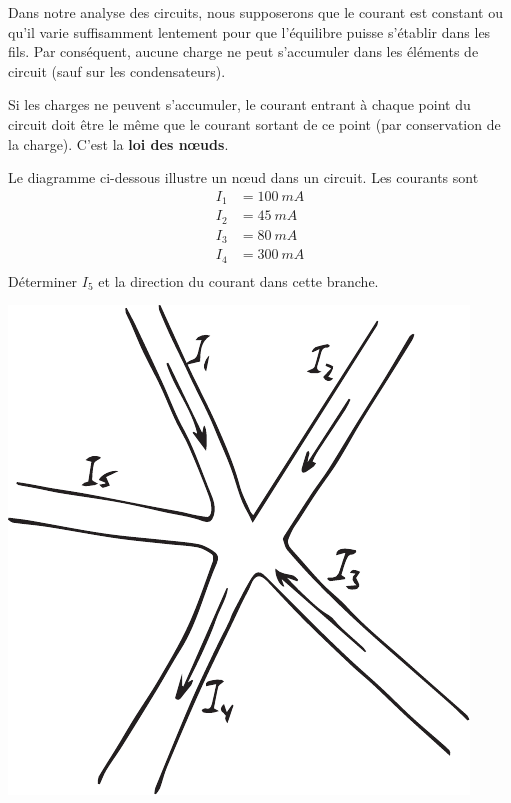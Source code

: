 Dans notre analyse des circuits, nous supposerons que le courant est constant
ou qu'il varie suffisamment lentement pour que l'équilibre puisse s'établir
dans les fils. Par conséquent, aucune charge ne peut s'accumuler dans les
éléments de circuit (sauf sur les condensateurs).

Si les charges ne peuvent s'accumuler, le courant entrant à chaque point du
circuit doit être le même que le courant sortant de ce point (par conservation
de la charge). C'est la \textbf{loi des n\oe uds}.


\begin{diapobox}

Le diagramme ci-dessous illustre un n\oe ud dans un circuit. Les courants sont
\begin{align*}
  I_1 &= \SI{100}{mA} \\
  I_2 &= \SI{45}{mA} \\
  I_3 &= \SI{80}{mA} \\
  I_4 &= \SI{300}{mA} \\
\end{align*}
Déterminer $I_5$ et la direction du courant dans cette branche.

\begin{center}
  \includegraphics[scale=0.5]{07-circuits-cc/figures/loi-noeuds.pdf}
\end{center}
\end{diapobox}

